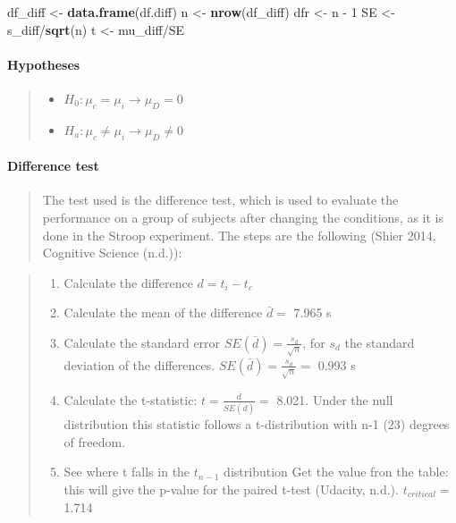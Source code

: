 \documentclass[]{article}
\newenvironment{Shaded}{\begin{snugshade}}{\end{snugshade}}
\newcommand{\KeywordTok}[1]{\textcolor[rgb]{0.13,0.29,0.53}{\textbf{{#1}}}}
\newcommand{\DecValTok}[1]{\textcolor[rgb]{0.00,0.00,0.81}{{#1}}}
\newcommand{\StringTok}[1]{\textcolor[rgb]{0.31,0.60,0.02}{{#1}}}
\newcommand{\NormalTok}[1]{{#1}}
\providecommand{\tightlist}{%
  \setlength{\itemsep}{0pt}\setlength{\parskip}{0pt}}
\let\oldparagraph\paragraph
\renewcommand{\paragraph}[1]{\oldparagraph{#1}\mbox{}}
\begin{document}
\begin{Shaded}
\begin{Highlighting}[]
\NormalTok{df_diff <-}\StringTok{ }\KeywordTok{data.frame}\NormalTok{(df.diff)}
\NormalTok{n <-}\StringTok{ }\KeywordTok{nrow}\NormalTok{(df_diff)}
\NormalTok{dfr <-}\StringTok{ }\NormalTok{n -}\StringTok{ }\DecValTok{1}
\NormalTok{SE <-}\StringTok{ }\NormalTok{s_diff/}\KeywordTok{sqrt}\NormalTok{(n)}
\NormalTok{t <-}\StringTok{ }\NormalTok{mu_diff/SE}
\end{Highlighting}
\end{Shaded}

\paragraph{\texorpdfstring{\textbf{Hypotheses}}{Hypotheses}}\label{hypotheses}

\begin{quote}
\begin{itemize}
\tightlist
\item
  \(H_0 : \mu_{c} = \mu_{i} \rightarrow \mu_D =0\)
\item
  \(H_a : \mu_{c} \neq \mu_{i} \rightarrow \mu_D \neq 0\)
\end{itemize}
\end{quote}

\paragraph{\texorpdfstring{\textbf{Difference
test}}{Difference test}}\label{difference-test}

\begin{quote}
The test used is the difference test, which is used to evaluate the
performance on a group of subjects after changing the conditions, as it
is done in the Stroop experiment. The steps are the following (Shier
2014, Cognitive Science (n.d.)):
\end{quote}

\begin{quote}
\begin{enumerate}
\def\labelenumi{\arabic{enumi}.}
\tightlist
\item
  Calculate the difference \(d= t_i-t_c\)
\item
  Calculate the mean of the difference \(\bar{d}=\) 7.965 s
\item
  Calculate the standard error \(SE(\bar{d})= \frac{s_d}{\sqrt{n}}\),
  for \(s_d\) the standard deviation of the differences.
  \(SE(\bar{d})= \frac{s_d}{\sqrt{n}}=\) 0.993 s
\item
  Calculate the t-statistic: \(t=\frac{\bar{d}}{SE(\bar{d})}=\) 8.021.
  Under the null distribution this statistic follows a t-distribution
  with n-1 (23) degrees of freedom.
\item
  See where t falls in the \(t_{n-1}\) distribution Get the value fron
  the table: this will give the p-value for the paired t-test (Udacity,
  n.d.). \(t_{critical}=\) 1.714
\end{enumerate}
\end{quote}
\end{document}
